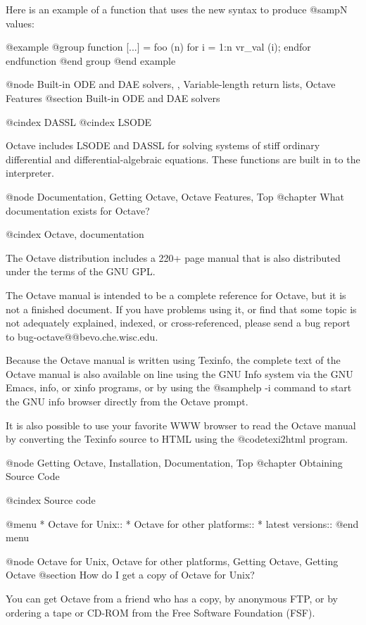 Here is an example of a function that uses the new syntax to produce
@samp{N} values:

@example
@group
function [...] = foo (n)
  for i = 1:n
    vr_val (i);
  endfor
endfunction
@end group
@end example

@node Built-in ODE and DAE solvers,  , Variable-length return lists, Octave Features
@section Built-in ODE and DAE solvers

@cindex DASSL
@cindex LSODE

Octave includes LSODE and DASSL for solving systems of stiff ordinary
differential and differential-algebraic equations.  These functions are
built in to the interpreter.

@node Documentation, Getting Octave, Octave Features, Top
@chapter What documentation exists for Octave?

@cindex Octave, documentation

The Octave distribution includes a 220+ page manual that is also
distributed under the terms of the GNU GPL.

The Octave manual is intended to be a complete reference for Octave, but
it is not a finished document.  If you have problems using it, or find
that some topic is not adequately explained, indexed, or
cross-referenced, please send a bug report to bug-octave@@bevo.che.wisc.edu.

Because the Octave manual is written using Texinfo, the complete text of
the Octave manual is also available on line using the GNU Info system
via the GNU Emacs, info, or xinfo programs, or by using the @samp{help -i} 
command to start the GNU info browser directly from the Octave prompt.

It is also possible to use your favorite WWW browser to read the Octave
manual by converting the Texinfo source to HTML using the
@code{texi2html} program.

@node Getting Octave, Installation, Documentation, Top
@chapter Obtaining Source Code

@cindex Source code

@menu
* Octave for Unix::             
* Octave for other platforms::  
* latest versions::             
@end menu

@node Octave for Unix, Octave for other platforms, Getting Octave, Getting Octave
@section How do I get a copy of Octave for Unix?

You can get Octave from a friend who has a copy, by anonymous FTP, or by
ordering a tape or CD-ROM from the Free Software Foundation (FSF).

